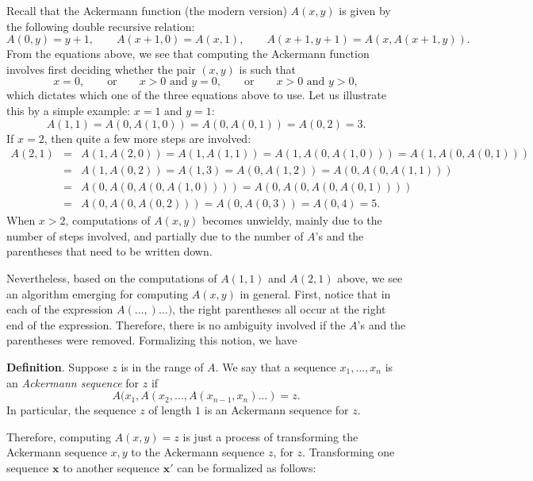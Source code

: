 \documentclass[12pt]{article}
\begin{document}
Recall that the Ackermann function (the modern version) $A(x,y)$ is given by the following double recursive relation:
$$A(0,y)=y+1,\qquad A(x+1,0)=A(x,1), \qquad A(x+1,y+1)=A(x,A(x+1,y)).$$
From the equations above, we see that computing the Ackermann function involves first deciding whether the pair $(x,y)$ is such that
$$x=0,\qquad \mbox{or}\qquad x>0 \mbox{ and }y=0,\qquad \mbox{or} \qquad x>0\mbox{ and }y>0,$$
which dictates which one of the three equations above to use.  Let us illustrate this by a simple example: $x=1$ and $y=1$:
$$A(1,1)=A(0,A(1,0))=A(0,A(0,1))=A(0,2)=3.$$
If $x=2$, then quite a few more steps are involved:
\begin{eqnarray*}
A(2,1)&=& A(1,A(2,0))= A(1,A(1,1)) = A(1,A(0,A(1,0))) = A(1,A(0,A(0,1))) \\ 
&=& A(1,A(0,2)) = A(1,3) = A(0,A(1,2)) = A(0,A(0,A(1,1))) \\
&=& A(0,A(0,A(0,A(1,0)))) = A(0,A(0,A(0,A(0,1)))) \\
&=& A(0,A(0,A(0,2))) = A(0,A(0,3)) = A(0,4) = 5.
\end{eqnarray*}
When $x>2$, computations of $A(x,y)$ becomes unwieldy, mainly due to the number of steps involved, and partially due to the number of $A$'s and the parentheses that need to be written down.

Nevertheless, based on the computations of $A(1,1)$ and $A(2,1)$ above, we see an algorithm emerging for computing $A(x,y)$ in general.  First, notice that in each of the expression $A(\ldots, )\ldots )$, the right parentheses all occur at the right end of the expression.  Therefore, there is no ambiguity involved if the $A$'s and the parentheses were removed.  Formalizing this notion, we have

\textbf{Definition}.  Suppose $z$ is in the range of $A$.  We say that a sequence $x_1,\ldots, x_n$ is an \emph{Ackermann sequence} for $z$ if $$A(x_1,A(x_2, \ldots, A(x_{n-1},x_n)\ldots )=z.$$
In particular, the sequence $z$ of length $1$ is an Ackermann sequence for $z$.

Therefore, computing $A(x,y)=z$ is just a process of transforming the Ackermann sequence $x,y$ to the Ackermann sequence $z$, for $z$.  Transforming one sequence $\boldsymbol{x}$ to another sequence $\boldsymbol{x}'$ can be formalized as follows:
\end{document}
